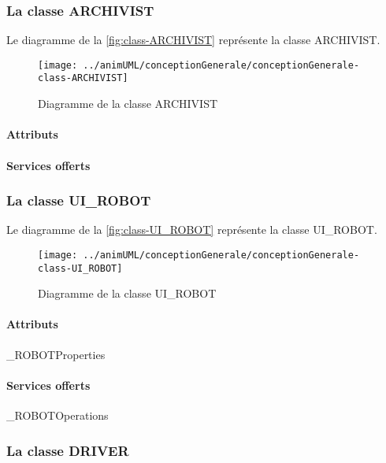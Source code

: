 \subsubsection{La classe ARCHIVIST}

Le diagramme de la \autoref{fig:class-ARCHIVIST} représente la classe ARCHIVIST.
\begin{figure}[H]
	\centering
	\texttt{[image: ../animUML/conceptionGenerale/conceptionGenerale-class-ARCHIVIST]}
	\caption{Diagramme de la classe ARCHIVIST}
	\label{fig:class-ARCHIVIST}
\end{figure}


\paragraph{Attributs}
\classARCHIVISTProperties
\paragraph{Services offerts}
\classARCHIVISTOperations
\subsubsection{La classe UI_ROBOT}

Le diagramme de la \autoref{fig:class-UI_ROBOT} représente la classe UI_ROBOT.
\begin{figure}[H]
	\centering
	\texttt{[image: ../animUML/conceptionGenerale/conceptionGenerale-class-UI\_ROBOT]}
	\caption{Diagramme de la classe UI_ROBOT}
	\label{fig:class-UI_ROBOT}
\end{figure}


\paragraph{Attributs}
\classUI_ROBOTProperties
\paragraph{Services offerts}
\classUI_ROBOTOperations
\subsubsection{La classe DRIVER}

